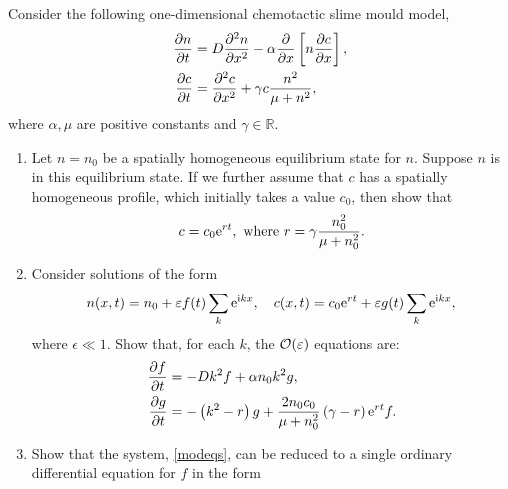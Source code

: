 \documentclass[a4paper, 12pt]{article}
\begin{document}
\begin{enumerate}[label={\bf \arabic{*}.\;}, ref={\arabic{*}},itemsep=3ex, left=0ex]
{    }


    {
      Consider the following one-dimensional chemotactic slime mould model,
      \begin{subequations}
        \begin{align}
          \pd{n}{t} &= D\pdd{n}{x} -\alpha\pd{}{x}\left[n\pd{c}{x}\right],\\
          \pd{c}{t} &= \pdd{c}{x} + \gamma c\frac{n^2}{\mu +n^2},
        \end{align}
      \end{subequations}
      where $\alpha,\mu$ are positive constants and $\gamma \in \mathbb{R}$.
      \begin{enumerate}[label=(\alph*)]
        \item{Let $n=n_0$ be a spatially homogeneous equilibrium state for $n$. Suppose $n$ is in this equilibrium state. If we further assume that $c$ has a spatially homogeneous profile, which initially takes a value $c_0$, then show that
            \begin{equation}
              c= c_0\mathrm{e}^{rt},\mbox{ where } r = \gamma\frac{n_0^2}{\mu+n_0^2}.
            \end{equation}
          }
        \item{Consider solutions of the form
            \begin{equation}
              n(x,t) = n_0 + \varepsilon f(t)\sum_{k}\mathrm{e}^{\mathrm{i} kx},\quad c(x,t) = c_0\mathrm{e}^{rt} + \varepsilon g(t)\sum_{k}\mathrm{e}^{\mathrm{i} kx},
            \end{equation}
            where $\epsilon\ll1$.
            Show that, for each $k$, the $\mathcal{O}(\varepsilon)$ equations are:
            \begin{subequations}
              \label{modeqs}
              \begin{align}
                \pd{f}{t} &= -Dk^2 f +\alpha n_0 k^2 g,\\
                \pd{g}{t} &= -\left(k^2 -r\right)g  + \frac{2n_0 c_0}{\mu + n_0^2}\left(\gamma -r\right)\e^{rt}f.
              \end{align}
            \end{subequations}
          }
        \item{Show that the system, \cref{modeqs}, can be reduced to a single ordinary differential equation for $f$ in the form
            \begin{align}

\end{align}}
\end{enumerate}}
\end{enumerate}
\end{document}

